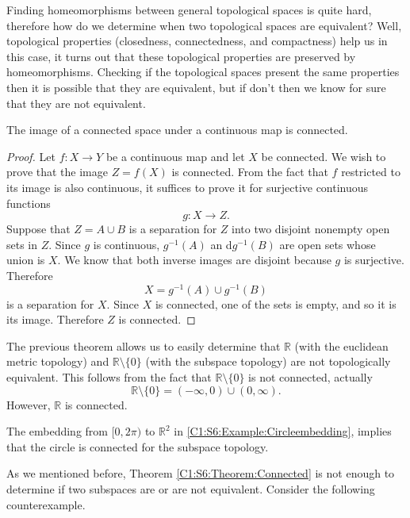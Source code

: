 \documentclass[
	fontsize=10pt, %
	twoside=false, %
	secnumdepth=1, %
]{kaobook}
\begin{document}
Finding homeomorphisms between general topological spaces is quite hard, therefore how do we determine when two topological spaces are equivalent? Well, topological properties (closedness, connectedness, and compactness) help us in this case, it turns out that these topological properties are preserved by homeomorphisms. Checking if the topological spaces present the same properties then it is possible that they are equivalent, but if don't then we know for sure that they are not equivalent. 

\begin{theorem}
\label{C1:S6:Theorem:Connected}
The image of a connected space under a continuous map is connected.
\end{theorem}
\begin{proof}
Let $f: X\to Y$ be a continuous map and let $X$ be connected. We wish to prove that the image $Z=f(X)$ is connected. From the fact that $f$ restricted to its image is also continuous, it suffices to prove it for surjective continuous functions $$g: X \to Z.$$ Suppose that $Z=A\cup B$ is a separation for $Z$ into two disjoint nonempty open sets in $Z.$ Since $g$ is continuous, $g^{-1}(A)$ an d$g^{-1}(B)$ are open sets whose union is $X.$ We know that both inverse images are disjoint because $g$ is surjective. Therefore $$X=g^{-1}(A)\cup g^{-1}(B)$$ is a separation for $X.$ Since $X$ is connected, one of the sets is empty, and so it is its image. Therefore $Z$ is connected. 
\end{proof}

\begin{example}
The previous theorem allows us to easily determine that  $\mathbb{R}$ (with the euclidean metric topology) and  $\mathbb{R}\setminus\{0\}$ (with the subspace topology) are not topologically equivalent. This follows from the fact that $\mathbb{R}\setminus\{0\}$ is not connected, actually $$\mathbb{R}\setminus\{0\}=(-\infty,0)\cup(0,\infty).$$ However, $\mathbb{R}$ is connected.
\end{example}

\begin{example}
The embedding from $[0,2\pi)$ to $\mathbb{R}^2$ in \ref{C1:S6:Example:Circleembedding}, implies that the circle is connected for the subspace topology. 
\end{example}

As we mentioned before, Theorem \ref{C1:S6:Theorem:Connected} is not enough to determine if two subspaces are or are not equivalent. Consider the following counterexample. 
\end{document}
